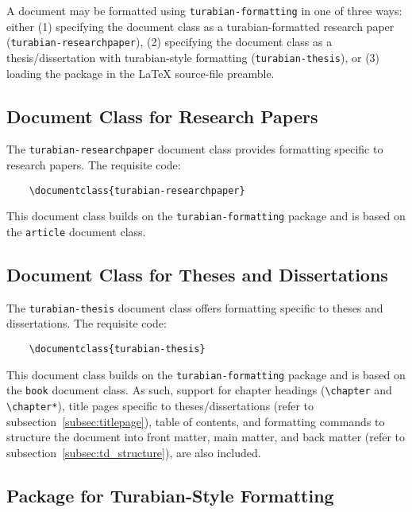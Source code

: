 \documentclass{article}
\begin{document}
A document may be formatted using \texttt{turabian-formatting} in one of three ways: either (1) specifying the document class as a turabian-formatted research paper (\texttt{turabian-researchpaper}), (2) specifying the document class as a thesis/dissertation with turabian-style formatting (\texttt{turabian-thesis}), or (3) loading the package in the \LaTeX{} source-file preamble.


\subsection{Document Class for Research Papers}

%
The \texttt{turabian-researchpaper} document class provides formatting specific to research papers. The requisite code:
\begin{lstlisting}
	\documentclass{turabian-researchpaper}
\end{lstlisting}

This document class builds on the \texttt{turabian-formatting} package and is based on the \texttt{article} document class.


\clearpage
\subsection{Document Class for Theses and Dissertations}

%
The \texttt{turabian-thesis} document class offers formatting specific to theses and dissertations. The requisite code:
\begin{lstlisting}
	\documentclass{turabian-thesis}
\end{lstlisting}

This document class builds on the \texttt{turabian-formatting} package and is based on the \texttt{book} document class. As such, support for chapter headings (\texttt{\textbackslash chapter} and \texttt{\textbackslash chapter*}), title pages specific to theses/dissertations (refer to subsection~\ref{subsec:titlepage}), table of contents, and formatting commands to structure the document into front matter, main matter, and back matter (refer to subsection~\ref{subsec:td_structure}), are also included.


\subsection{Package for Turabian-Style Formatting}
\end{document}

